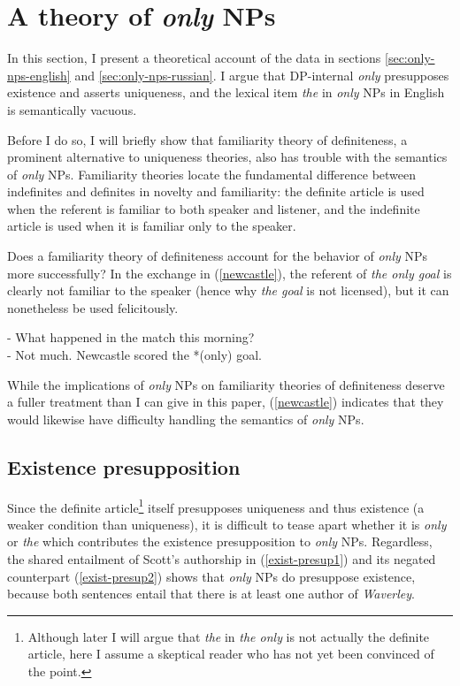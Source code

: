 \section{A theory of \textit{only} NPs \label{sec:my-theory}}
In this section, I present a theoretical account of the data in sections \ref{sec:only-nps-english} and \ref{sec:only-nps-russian}. I argue that DP-internal \textit{only} presupposes existence and asserts uniqueness, and the lexical item \textit{the} in \textit{only} NPs in English is semantically vacuous.

Before I do so, I will briefly show that  familiarity theory of definiteness, a prominent alternative to uniqueness theories, also has trouble with the semantics of \textit{only} NPs. Familiarity theories locate the fundamental difference between indefinites and definites in novelty and familiarity: the definite article is used when the referent is familiar to both speaker and listener, and the indefinite article is used when it is familiar only to the speaker.

Does a familiarity theory of definiteness account for the behavior of \textit{only} NPs more successfully? In the exchange in (\ref{newcastle}), the referent of \textit{the only goal} is clearly not familiar to the speaker (hence why \textit{the goal} is not licensed), but it can nonetheless be used felicitously.

\begin{exe}
	\ex \label{newcastle}
	- What happened in the match this morning? \\
	- Not much. Newcastle scored the *(only) goal.
\end{exe}

While the implications of \textit{only} NPs on familiarity theories of definiteness deserve a fuller treatment than I can give in this paper, (\ref{newcastle}) indicates that they would likewise have difficulty handling the semantics of \textit{only} NPs.

\subsection{Existence presupposition}
Since the definite article\footnote{Although later I will argue that \textit{the} in \textit{the only} is not actually the definite article, here I assume a skeptical reader who has not yet been convinced of the point.} itself presupposes uniqueness and thus existence (a weaker condition than uniqueness), it is difficult to tease apart whether it is \textit{only} or \textit{the} which contributes the existence presupposition to \textit{only} NPs. Regardless, the shared entailment of Scott's authorship in (\ref{exist-presup1}) and its negated counterpart (\ref{exist-presup2}) shows that \textit{only} NPs do presuppose existence, because both sentences entail that there is at least one author of \textit{Waverley}.

